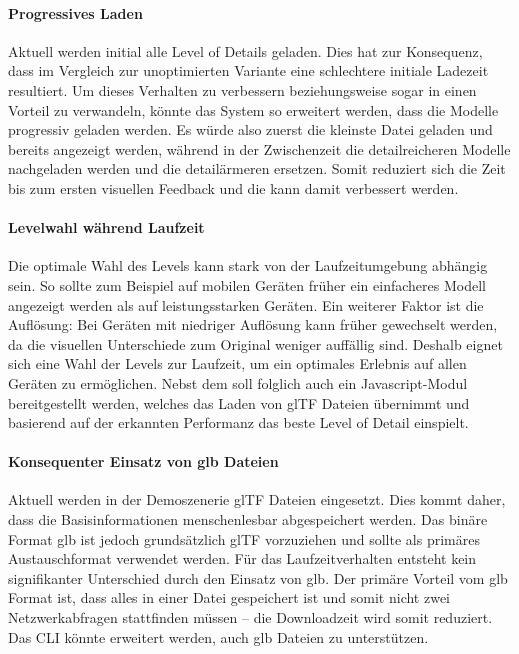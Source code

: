 \paragraph{Progressives Laden}
Aktuell werden initial alle Level of Details geladen. Dies hat zur Konsequenz, dass im Vergleich zur unoptimierten Variante eine schlechtere initiale Ladezeit resultiert. Um dieses Verhalten zu verbessern beziehungsweise sogar in einen Vorteil zu verwandeln, könnte das System so erweitert werden, dass die Modelle progressiv geladen werden. Es würde also zuerst die kleinste Datei geladen und bereits angezeigt werden, während in der Zwischenzeit die detailreicheren Modelle nachgeladen werden und die detailärmeren ersetzen. Somit reduziert sich die Zeit bis zum ersten visuellen Feedback und die  kann damit verbessert werden.

\paragraph{Levelwahl während Laufzeit}
Die optimale Wahl des Levels kann stark von der Laufzeitumgebung abhängig sein. So sollte zum Beispiel auf mobilen Geräten früher ein einfacheres Modell angezeigt werden als auf leistungsstarken Geräten. Ein weiterer Faktor ist die Auflösung: Bei Geräten mit niedriger Auflösung kann früher gewechselt werden, da die visuellen Unterschiede zum Original weniger auffällig sind.
Deshalb eignet sich eine Wahl der Levels zur Laufzeit, um ein optimales Erlebnis auf allen Geräten zu ermöglichen.
Nebst dem  soll folglich auch ein Javascript-Modul bereitgestellt werden, welches das Laden von glTF Dateien übernimmt und basierend auf der erkannten Performanz das beste Level of Detail einspielt.

\paragraph{Konsequenter Einsatz von glb Dateien}
Aktuell werden in der Demoszenerie glTF Dateien eingesetzt. Dies kommt daher, dass die Basisinformationen menschenlesbar abgespeichert werden. Das binäre Format glb ist jedoch grundsätzlich glTF vorzuziehen und sollte als primäres Austauschformat verwendet werden. Für das Laufzeitverhalten entsteht kein signifikanter Unterschied durch den Einsatz von glb. Der primäre Vorteil vom glb Format ist, dass alles in einer Datei gespeichert ist und somit nicht zwei Netzwerkabfragen stattfinden müssen – die Downloadzeit wird somit reduziert. Das CLI könnte erweitert werden, auch glb Dateien zu unterstützen.
